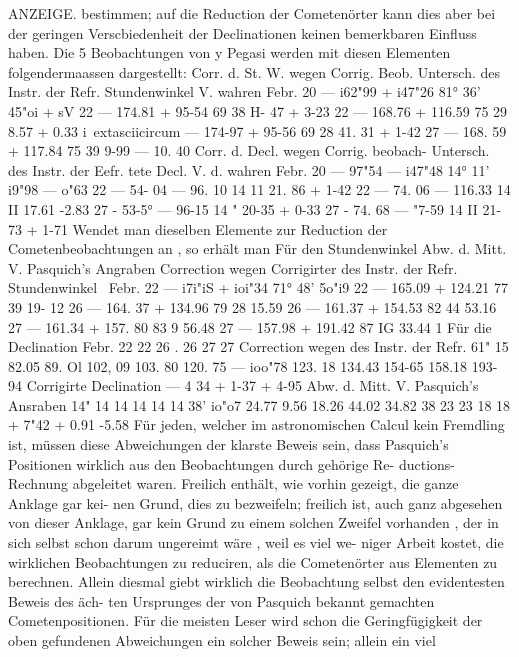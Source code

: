 \documentclass[12pt,a4paper]{article}
\begin{document}
{{{{{{{{ANZEIGE. bestimmen;  auf  die  Reduction  der  Cometenörter  kann   dies   aber   bei  der   geringen  Verscbiedenheit  der Declinationen  keinen  bemerkbaren  Einfluss  haben. Die  5  Beobachtungen  von  y  Pegasi  werden  mit  diesen  Elementen  folgendermaassen  dargestellt: Corr.  d.  St. W.  wegen Corrig.  Beob. Untersch. des  Instr. der  Refr. Stundenwinkel V.  wahren Febr.   20 ---  i62"99 +  i47"26 81°  36'    45"oi +  sV 22 ---  174.81 +    95-54 69     38     H-  47 +  3-23 22 ---  168.76 +  116.59 75     29       8.57 +  0.33 i\	extasciicircum{}{ } ---  174-97 +    95-56 69     28     41.  31 +  1-42 27 ---  168.  59 +  117.84 75     39       9-99 --- 10. 40 Corr.  d.  Decl.  wegen Corrig.  beobach- Untersch. des  Instr. der  Eefr. tete  Decl. V.  d.  wahren Febr.   20 ---  97"54 ---  i47"48 14°   11'    i9"98 ---  o"63 22 ---  54- 04 ---    96. 10 14     11     21. 86 +  1-42 22 ---  74.  06 ---  116.33 14     II     17.61 -2.83 27 -  53-5° ---   96-15 14     "     20-35 +  0-33 27 -  74.  68 ---  "7-59 14     II     21-73 +  1-71 Wendet  man  dieselben  Elemente  zur  Reduction  der  Cometenbeobachtungen  an ,  so  erhält  man Für  den  Stundenwinkel Abw.  d.  Mitt. V.  Pasquich's Angraben Correction  wegen Corrigirter des  Instr. der  Refr. Stundenwinkel    \ Febr.  22 ---  i7i"iS +  ioi"34 71°  48'    5o"i9 22 ---  165.09 +  124.21 77     39     19- 12 26 ---  164. 37 +  134.96 79     28     15.59 26 ---  161.37 +  154.53 82     44     53.16 27 ---  161.34 +  157.  80 83       9     56.48 27 ---  157.98 +  191.42 87     IG     33.44     1 Für  die  Declination Febr.  22 22 26 .     26 27 27 Correction  wegen des  Instr.        der  Refr. 61"  15 82.05 89.  Ol 102, 09 103.  80 120.  75 --- ioo"78 123. 18 134.43 154-65 158.18 193-  94 Corrigirte Declination ---  4  34 +  1-37 +  4-95 Abw.  d.  Mitt. V.  Pasquich's Ansraben 14" 14 14 14 14 14 38'  io"o7 24.77 9.56 18.26 44.02 34.82 38 23 23 18 18 +  7"42 +  0.91 -5.58 Für  jeden,  welcher  im  astronomischen  Calcul  kein  Fremdling  ist,  müssen  diese  Abweichungen der  klarste  Beweis  sein,  dass  Pasquich's  Positionen  wirklich  aus  den  Beobachtungen  durch  gehörige  Re- ductions-Rechnung  abgeleitet  waren.  Freilich  enthält,  wie  vorhin  gezeigt,  die  ganze  Anklage  gar  kei- nen Grund,  dies  zu  bezweifeln;  freilich  ist,  auch  ganz  abgesehen  von  dieser  Anklage,  gar  kein  Grund zu  einem  solchen  Zweifel  vorhanden ,  der  in  sich  selbst  schon  darum  ungereimt  wäre ,  weil  es  viel  we- niger Arbeit  kostet,  die  wirklichen  Beobachtungen  zu  reduciren,  als  die  Cometenörter  aus  Elementen zu  berechnen.  Allein  diesmal  giebt  wirklich  die  Beobachtung  selbst  den  evidentesten  Beweis  des  äch- ten Ursprunges  der  von  Pasquich  bekannt  gemachten  Cometenpositionen.  Für  die  meisten  Leser  wird schon  die  Geringfügigkeit  der  oben  gefundenen  Abweichungen   ein  solcher  Beweis  sein;    allein  ein    viel

}}}}}}}}
\end{document}
